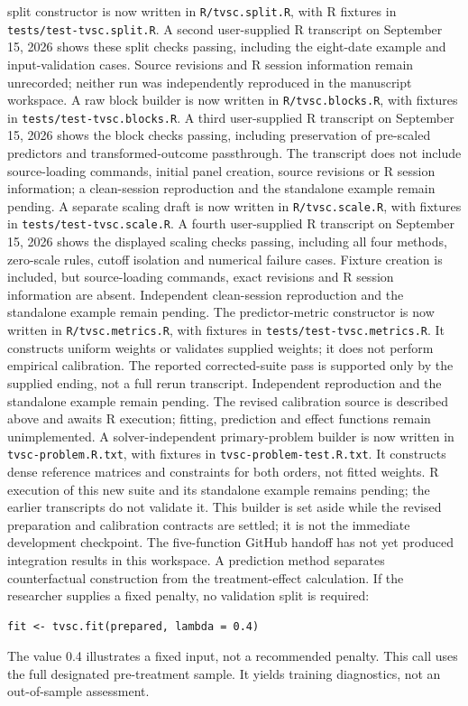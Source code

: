 \documentclass[11pt]{article}
\begin{document}
split constructor is now written in \texttt{R/tvsc.split.R}, with R
fixtures in \texttt{tests/test-tvsc.split.R}. A second user-supplied R
transcript on September 15, 2026 shows these split checks passing, including
the eight-date example and input-validation cases. Source revisions and
R session information remain unrecorded; neither run was independently
reproduced in the manuscript workspace. A raw block builder is now written
in \texttt{R/tvsc.blocks.R}, with fixtures in
\texttt{tests/test-tvsc.blocks.R}. A third user-supplied R transcript on
September 15, 2026 shows the block checks passing, including preservation
of pre-scaled predictors and transformed-outcome passthrough. The transcript
does not include source-loading commands, initial panel creation, source
revisions or R session information; a clean-session reproduction and the
standalone example remain pending. A separate scaling draft is now written
in \texttt{R/tvsc.scale.R}, with fixtures in
\texttt{tests/test-tvsc.scale.R}. A fourth user-supplied R transcript on
September 15, 2026 shows the displayed scaling checks passing, including
all four methods, zero-scale rules, cutoff isolation and numerical failure
cases. Fixture creation is included, but source-loading commands, exact
revisions and R session information are absent. Independent clean-session
reproduction and the standalone example remain pending.
The predictor-metric constructor is now written in
\texttt{R/tvsc.metrics.R}, with fixtures in
\texttt{tests/test-tvsc.metrics.R}. It constructs uniform weights or validates
supplied weights; it does not perform empirical calibration. The reported
corrected-suite pass is supported only by the supplied ending, not a full
rerun transcript. Independent reproduction and the standalone example
remain pending.
The revised calibration source is described above and awaits R execution;
fitting, prediction and effect functions remain unimplemented.
A solver-independent primary-problem builder is now written in
\texttt{tvsc-problem.R.txt}, with fixtures in
\texttt{tvsc-problem-test.R.txt}. It constructs dense reference matrices
and constraints for both orders, not fitted weights. R execution of this
new suite and its standalone example remains pending; the earlier
transcripts do not validate it. This builder is set aside while the revised
preparation and calibration contracts are settled; it is not the immediate
development checkpoint. The five-function GitHub handoff has not
yet produced integration results in this workspace.
A prediction method separates counterfactual construction from
the treatment-effect calculation.
If the researcher supplies a fixed penalty, no validation split is required:
\begin{verbatim}
fit <- tvsc.fit(prepared, lambda = 0.4)
\end{verbatim}
The value 0.4 illustrates a fixed input, not a recommended penalty. This
call uses the full designated pre-treatment sample. It yields training
diagnostics, not an out-of-sample assessment.
\end{document}
